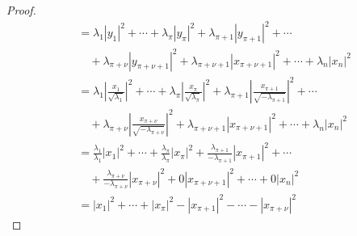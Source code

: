 \documentclass[dvipdfmx]{jsarticle}
\begin{document}
\begin{proof}
\begin{align*}
&= \lambda_{1}\left| y_{1} \right|^{2} + \cdots + \lambda_{\pi}\left| y_{\pi} \right|^{2} + \lambda_{\pi + 1}\left| y_{\pi + 1} \right|^{2} + \cdots \\
&\quad + \lambda_{\pi + \nu}\left| y_{\pi + \nu + 1} \right|^{2} + \lambda_{\pi + \nu + 1}\left| x_{\pi + \nu + 1} \right|^{2} + \cdots + \lambda_{n}\left| x_{n} \right|^{2}\\
&= \lambda_{1}\left| \frac{x_{1}}{\sqrt{\lambda_{1}}} \right|^{2} + \cdots + \lambda_{\pi}\left| \frac{x_{\pi}}{\sqrt{\lambda_{\pi}}} \right|^{2} + \lambda_{\pi + 1}\left| \frac{x_{\pi + 1}}{\sqrt{- \lambda_{\pi + 1}}} \right|^{2} + \cdots \\
&\quad + \lambda_{\pi + \nu}\left| \frac{x_{\pi + \nu}}{\sqrt{- \lambda_{\pi + \nu}}} \right|^{2} + \lambda_{\pi + \nu + 1}\left| x_{\pi + \nu + 1} \right|^{2} + \cdots + \lambda_{n}\left| x_{n} \right|^{2}\\
&= \frac{\lambda_{1}}{\lambda_{1}}\left| x_{1} \right|^{2} + \cdots + \frac{\lambda_{\pi}}{\lambda_{\pi}}\left| x_{\pi} \right|^{2} + \frac{\lambda_{\pi + 1}}{- \lambda_{\pi + 1}}\left| x_{\pi + 1} \right|^{2} + \cdots \\
&\quad + \frac{\lambda_{\pi + \nu}}{- \lambda_{\pi + \nu}}\left| x_{\pi + \nu} \right|^{2} + 0\left| x_{\pi + \nu + 1} \right|^{2} + \cdots + 0\left| x_{n} \right|^{2}\\
&= \left| x_{1} \right|^{2} + \cdots + \left| x_{\pi} \right|^{2} - \left| x_{\pi + 1} \right|^{2} - \cdots - \left| x_{\pi + \nu} \right|^{2}
\end{align*}
\end{proof}
\end{document}

